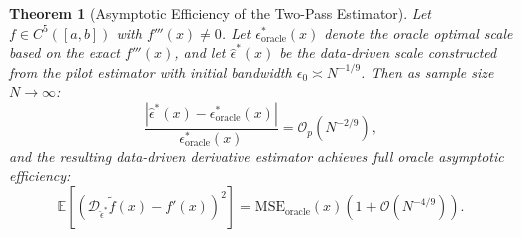 \documentclass[11pt,a4paper]{article}
\newtheorem{theorem}{Theorem}
\theoremstyle{definition}
\begin{document}
\begin{theorem}[Asymptotic Efficiency of the Two-Pass Estimator]
\label{thm:calibration}
Let $f \in C^5([a, b])$ with $f'''(x) \neq 0$. Let $\epsilon_{\text{oracle}}^*(x)$ denote the oracle optimal scale based on the exact $f'''(x)$, and let $\hat{\epsilon}^*(x)$ be the data-driven scale constructed from the pilot estimator with initial bandwidth $\epsilon_0 \asymp N^{-1/9}$. Then as sample size $N \to \infty$:
\begin{equation}
\frac{|\hat{\epsilon}^*(x) - \epsilon_{\text{oracle}}^*(x)|}{\epsilon_{\text{oracle}}^*(x)} = \mathcal{O}_p\left( N^{-2/9} \right),
\end{equation}
and the resulting data-driven derivative estimator achieves full oracle asymptotic efficiency:
\begin{equation}
\mathbb{E}\left[ \left(\mathcal{D}_{\hat{\epsilon}^*} \tilde{f}(x) - f'(x)\right)^2 \right] = \text{MSE}_{\text{oracle}}(x) \left( 1 + \mathcal{O}\left( N^{-4/9} \right) \right).
\end{equation}
\end{theorem}
\end{document}

